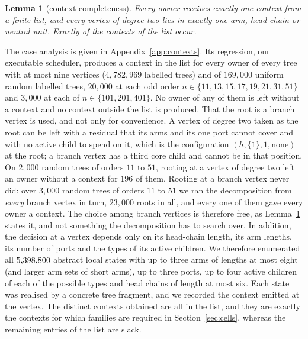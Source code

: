 \documentclass[11pt,a4paper]{article}
\theoremstyle{plain}
\newtheorem{lemma}[theorem]{Lemma}
\theoremstyle{definition}
\theoremstyle{remark}
\begin{document}
\begin{table}[t]
\centering
\caption{The neutral blocks of Lemma~\ref{lem:neutralpairs}.  The labels are
read as multiples of a fresh parameter $t$, the ports first and then the arms
in the order listed, each arm from the owner outwards.  The equal pairs are
the closed form $\pm(-2)^i$; the others come from an exhaustive search and are
re-verified from the labels alone.}
\label{tab:blocks}
\small

\end{table}

\begin{lemma}[context completeness]\label{lem:contexts}
Every owner receives exactly one context from a finite list, and every
vertex of degree two lies in exactly one arm, head chain or neutral unit.
Exactly \NumEmittable{} of the contexts of the list occur.
\end{lemma}

The case analysis is given in Appendix~\ref{app:contexts}.  Its regression,
our executable scheduler, produces a context in the list for every owner of
every tree with at most nine vertices ($4{,}782{,}969$ labelled trees) and of
$169{,}000$ uniform random labelled trees, $20{,}000$ at each odd order
$n\in\{11,13,15,17,19,21,31,51\}$ and $3{,}000$ at each of
$n\in\{101,201,401\}$.  No owner of any of them is left without a context and
no context outside the list is produced.  That the root is a branch vertex is used, and not
only for convenience.  A vertex of degree two taken as the root can be left
with a residual that its arms and its one port cannot cover and with no active
child to spend on it, which is the configuration
$(h,\{1\},1,\mathrm{none})$ at the root; a branch vertex has a third core child
and cannot be in that position.  On $2{,}000$ random trees of orders $11$ to
$51$, rooting at a vertex of degree two left an owner without a context for
$196$ of them.  Rooting at a branch vertex never did: over $3{,}000$ random
trees of orders $11$ to $51$ we ran the decomposition from \emph{every} branch
vertex in turn, $23{,}000$ roots in all, and every one of them gave every owner
a context.  The choice among branch vertices is therefore free, as
Lemma~\ref{lem:contexts} states it, and not something the decomposition has to
search over.
In addition, the decision at a vertex depends only on its head-chain
length, its arm lengths, its number of ports and the types of its active
children.  We therefore enumerated all $5{,}398{,}800$ abstract local states with up to
three arms of lengths at most eight (and larger arm sets of short arms), up to
three ports, up to four active children of each of the possible types and
head chains of length at most six.  Each state was realised by a concrete tree
fragment, and we recorded the context emitted at the vertex.  The
\NumEmittable{} distinct contexts obtained are all in the list, and they are
exactly the contexts for which families are required in
Section~\ref{sec:cells}, whereas the remaining entries of the list are slack.
\end{document}

